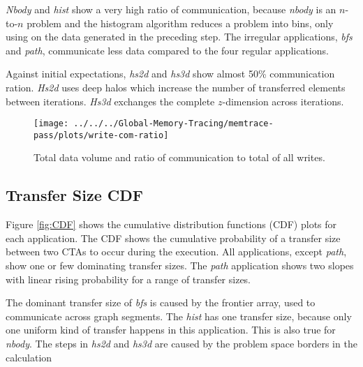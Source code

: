 \textit{Nbody} and \textit{hist} show a very high ratio of communication, because \textit{nbody} is an $n$-to-$n$ problem and the histogram algorithm reduces a problem into bins, only using on the data generated in the preceding step. The irregular applications, \textit{bfs} and \textit{path}, communicate less data compared to the four regular applications.

Against initial expectations,  \textit{hs2d} and \textit{hs3d} show almost 50\% communication ration. \textit{Hs2d} uses deep halos which increase the number of transferred elements between iterations. \textit{Hs3d} exchanges the complete $z$-dimension across iterations. 


\begin{figure}[t]
	\centering
	\texttt{[image: ../../../Global-Memory-Tracing/memtrace-pass/plots/write-com-ratio]}
	\caption{Total data volume and ratio of communication to total of all writes.}
	\label{com-ratio}
\end{figure}
\subsection{Transfer Size CDF}
Figure \ref{fig:CDF} shows the cumulative distribution functions (CDF) plots for each application. The CDF shows the cumulative probability of a transfer size between two CTAs to occur during the execution. All applications, except \textit{path}, show one or few dominating transfer sizes. The \textit{path} application shows two slopes with linear rising probability for a range of transfer sizes.

The dominant transfer size of \textit{bfs} is caused by the frontier array, used to communicate across graph segments. The \textit{hist} has one transfer size, because only one uniform kind of transfer happens in this application. This is also true for \textit{nbody}. The steps in \textit{hs2d} and \textit{hs3d} are caused by the problem space borders in the calculation

